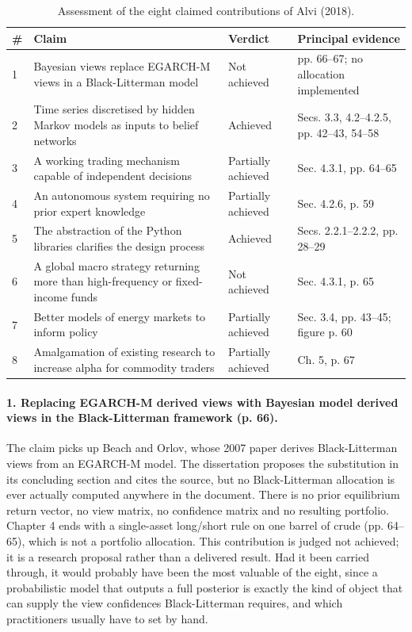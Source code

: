\documentclass[11pt,a4paper]{article}
\begin{document}
\begin{table}[H]
\centering
\caption{Assessment of the eight claimed contributions of Alvi (2018).}
\label{tab:contrib}
\renewcommand{\arraystretch}{1.25}
\begin{tabular}{@{}p{0.5cm}p{7.4cm}p{2.6cm}p{4.2cm}@{}}
\toprule
\textbf{\#} & \textbf{Claim} & \textbf{Verdict} & \textbf{Principal evidence} \\
\midrule
1 & Bayesian views replace EGARCH-M views in a Black-Litterman model & Not achieved &
pp. 66--67; no allocation implemented \\
2 & Time series discretised by hidden Markov models as inputs to belief networks & Achieved &
Secs. 3.3, 4.2--4.2.5, pp. 42--43, 54--58 \\
3 & A working trading mechanism capable of independent decisions & Partially achieved &
Sec. 4.3.1, pp. 64--65 \\
4 & An autonomous system requiring no prior expert knowledge & Partially achieved &
Sec. 4.2.6, p. 59 \\
5 & The abstraction of the Python libraries clarifies the design process & Achieved &
Secs. 2.2.1--2.2.2, pp. 28--29 \\
6 & A global macro strategy returning more than high-frequency or fixed-income funds & Not achieved
& Sec. 4.3.1, p. 65 \\
7 & Better models of energy markets to inform policy & Partially achieved &
Sec. 3.4, pp. 43--45; figure p. 60 \\
8 & Amalgamation of existing research to increase alpha for commodity traders & Partially achieved
& Ch. 5, p. 67 \\
\bottomrule
\end{tabular}
\end{table}

\paragraph{1. Replacing EGARCH-M derived views with Bayesian model derived views in the
Black-Litterman framework (p. 66).} The claim picks up Beach and Orlov, whose 2007 paper derives
Black-Litterman views from an EGARCH-M model. The dissertation proposes the substitution in its
concluding section and cites the source, but no Black-Litterman allocation is ever actually
computed anywhere in the document. There is no prior equilibrium return vector, no view matrix,
no confidence matrix and no resulting portfolio. Chapter 4 ends with a single-asset long/short
rule on one barrel of crude (pp. 64--65), which is not a portfolio allocation. This contribution
is judged not achieved; it is a research proposal rather than a delivered result. Had it been
carried through, it would probably have been the most valuable of the eight, since a probabilistic
model that outputs a full posterior is exactly the kind of object that can supply the view
confidences Black-Litterman requires, and which practitioners usually have to set by hand.
\end{document}
